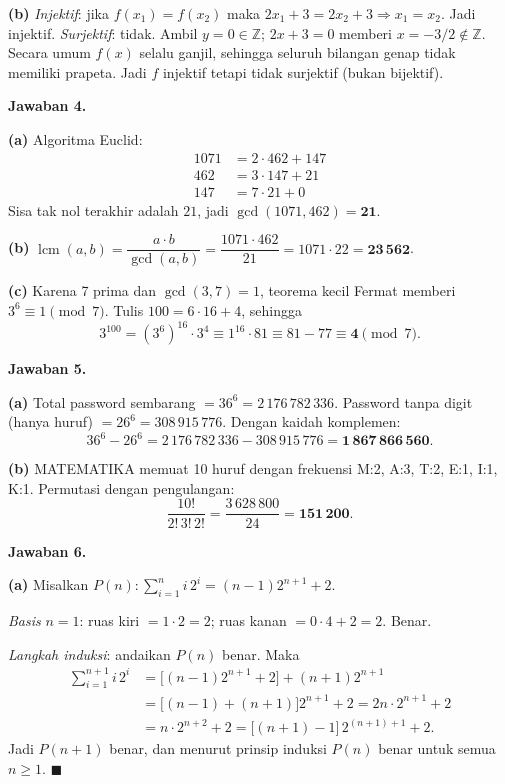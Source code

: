 \documentclass[11pt,a4paper]{article}
\newcommand{\jawab}[1]{\vspace{4pt}\noindent\textbf{Jawaban #1.}\par\nobreak\vspace{2pt}}
\DeclareMathOperator{\lcmop}{lcm}
\newcommand{\Zset}{\mathbb{Z}}
\begin{document}
\textbf{(b)} \emph{Injektif}: jika $f(x_1) = f(x_2)$ maka $2x_1 + 3 = 2x_2 + 3
\Rightarrow x_1 = x_2$. Jadi injektif.
\emph{Surjektif}: tidak. Ambil $y = 0 \in \Zset$; $2x + 3 = 0$ memberi
$x = -3/2 \notin \Zset$. Secara umum $f(x)$ selalu ganjil, sehingga seluruh
bilangan genap tidak memiliki prapeta. Jadi $f$ injektif tetapi tidak surjektif
(bukan bijektif).

\jawab{4}
\textbf{(a)} Algoritma Euclid:
\begin{align*}
1071 &= 2 \cdot 462 + 147\\
462  &= 3 \cdot 147 + 21\\
147  &= 7 \cdot 21 + 0
\end{align*}
Sisa tak nol terakhir adalah $21$, jadi $\gcd(1071,462) = \mathbf{21}$.

\textbf{(b)} $\lcmop(a,b) = \dfrac{a \cdot b}{\gcd(a,b)}
= \dfrac{1071 \cdot 462}{21} = 1071 \cdot 22 = \mathbf{23\,562}$.

\textbf{(c)} Karena 7 prima dan $\gcd(3,7)=1$, teorema kecil Fermat memberi
$3^{6} \equiv 1 \pmod 7$. Tulis $100 = 6 \cdot 16 + 4$, sehingga
\[
3^{100} = (3^{6})^{16} \cdot 3^{4} \equiv 1^{16} \cdot 81 \equiv 81 - 77
\equiv \mathbf{4} \pmod 7 .
\]

\jawab{5}
\textbf{(a)} Total password sembarang $= 36^{6} = 2\,176\,782\,336$.
Password tanpa digit (hanya huruf) $= 26^{6} = 308\,915\,776$.
Dengan kaidah komplemen:
\[
36^{6} - 26^{6} = 2\,176\,782\,336 - 308\,915\,776 = \mathbf{1\,867\,866\,560}.
\]

\textbf{(b)} MATEMATIKA memuat 10 huruf dengan frekuensi
M:2, A:3, T:2, E:1, I:1, K:1. Permutasi dengan pengulangan:
\[
\frac{10!}{2!\,3!\,2!} = \frac{3\,628\,800}{24} = \mathbf{151\,200}.
\]

\jawab{6}
\textbf{(a)} Misalkan $P(n): \sum_{i=1}^{n} i\,2^{i} = (n-1)2^{n+1} + 2$.

\emph{Basis} $n = 1$: ruas kiri $= 1 \cdot 2 = 2$; ruas kanan $= 0 \cdot 4 + 2 = 2$. Benar.

\emph{Langkah induksi}: andaikan $P(n)$ benar. Maka
\begin{align*}
\sum_{i=1}^{n+1} i\,2^{i}
&= \Big[(n-1)2^{n+1} + 2\Big] + (n+1)2^{n+1}\\
&= \big[(n-1) + (n+1)\big]2^{n+1} + 2
 = 2n \cdot 2^{n+1} + 2\\
&= n \cdot 2^{n+2} + 2
 = \big[(n+1) - 1\big]\,2^{(n+1)+1} + 2 .
\end{align*}
Jadi $P(n+1)$ benar, dan menurut prinsip induksi $P(n)$ benar untuk semua
$n \ge 1$. $\blacksquare$
\end{document}
